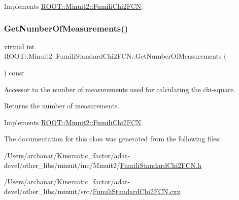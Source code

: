 Implements \mbox{\hyperlink{classROOT_1_1Minuit2_1_1FumiliChi2FCN_afa1acb8484d1c1825de0dd641e301717}{R\+O\+O\+T\+::\+Minuit2\+::\+Fumili\+Chi2\+F\+CN}}.

\mbox{\label{classROOT_1_1Minuit2_1_1FumiliStandardChi2FCN_a868b7c1aa7d2597db475ca99799c9131}} 
\subsubsection{\texorpdfstring{GetNumberOfMeasurements()}{GetNumberOfMeasurements()}\hspace{0.1cm}{\footnotesize\ttfamily [3/3]}}
{\footnotesize\ttfamily virtual int R\+O\+O\+T\+::\+Minuit2\+::\+Fumili\+Standard\+Chi2\+F\+C\+N\+::\+Get\+Number\+Of\+Measurements (\begin{DoxyParamCaption}{ }\end{DoxyParamCaption}) const\hspace{0.3cm}{\ttfamily [virtual]}}

Accessor to the number of measurements used for calculating the chi-\/square.

\begin{DoxyReturn}{Returns}
the number of measurements. 
\end{DoxyReturn}


Implements \mbox{\hyperlink{classROOT_1_1Minuit2_1_1FumiliChi2FCN_afa1acb8484d1c1825de0dd641e301717}{R\+O\+O\+T\+::\+Minuit2\+::\+Fumili\+Chi2\+F\+CN}}.



The documentation for this class was generated from the following files\+:\begin{DoxyCompactItemize}
\item 
/\+Users/archanar/\+Kinematic\+\_\+factor/adat-\/devel/other\+\_\+libs/minuit/inc/\+Minuit2/\mbox{\hyperlink{adat-devel_2other__libs_2minuit_2inc_2Minuit2_2FumiliStandardChi2FCN_8h}{Fumili\+Standard\+Chi2\+F\+C\+N.\+h}}\item 
/\+Users/archanar/\+Kinematic\+\_\+factor/adat-\/devel/other\+\_\+libs/minuit/src/\mbox{\hyperlink{adat-devel_2other__libs_2minuit_2src_2FumiliStandardChi2FCN_8cxx}{Fumili\+Standard\+Chi2\+F\+C\+N.\+cxx}}\end{DoxyCompactItemize}
